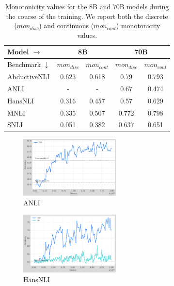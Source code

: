 \begin{table}
\centering
\begin{tabular}{|l|cc|cc|}
    \hline
    Model $\rightarrow$ & \multicolumn{2}{c|}{8B} & \multicolumn{2}{c|}{70B} \\
    \hline
    Benchmark $\downarrow$ & $mon_{disc}$  & $mon_{cont}$ & $mon_{disc}$ & $mon_{cont}$ \\
    \hline
    AbductiveNLI & 0.623 & 0.618 & 0.79 & 0.793 \\
    \hline
    ANLI & - & - & 0.67 & 0.474 \\
    \hline
    HansNLI & 0.316 & 0.457 & 0.57 & 0.629 \\
    \hline
    MNLI & 0.335 & 0.507 & 0.772 & 0.798 \\
    \hline
    SNLI & 0.051 & 0.382 & 0.637 & 0.651 \\
    \hline
    \end{tabular}
\caption{Monotonicity values for the 8B and 70B models during the course of the training. We report both the discrete ($mon_{disc}$) and continuous ($mon_{cont}$) monotonicity values.}
\label{tab:monotonicity}
\end{table}

\begin{figure}[t]
    \centering
    \includegraphics[width=0.45\textwidth]{nli_plots/anli_intermediate.png}
    \caption{ANLI}
    \label{fig:anli_int}
\end{figure}

\begin{figure}[t]
    \centering
    \includegraphics[width=0.45\textwidth]{nli_plots/hansnli_intermediate.png}
    \caption{HansNLI}
    \label{fig:hansnli_int}
\end{figure}

